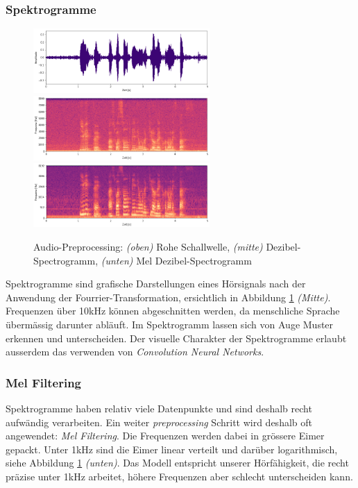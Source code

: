 \subsubsection{Spektrogramme}
\begin{figure}[hbt]
	\centering
		\includegraphics[width=0.6\textwidth]{assets/audio_raw.png}
		\includegraphics[width=0.6\textwidth]{assets/audio_log.png}
		\includegraphics[width=0.6\textwidth]{assets/audio_mel.png}
	\centering
	\caption{Audio-Preprocessing: \textit{(oben)} Rohe Schallwelle, \textit{(mitte)}
		     Dezibel-Spectrogramm, 
		     \textit{(unten)} Mel Dezibel-Spectrogramm}
	\label{img:preprocessing}
\end{figure}
Spektrogramme sind grafische Darstellungen eines Hörsignals nach der Anwendung der Fourrier-Transformation\parencite[]['Spectrograms']{fourrier}, ersichtlich in Abbildung \ref{img:preprocessing} \textit{(Mitte)}. Frequenzen über 10kHz können abgeschnitten werden, da menschliche Sprache übermässig darunter abläuft\parencite{tenkHz}. Im Spektrogramm lassen sich von Auge Muster erkennen und unterscheiden. Der visuelle Charakter der Spektrogramme erlaubt ausserdem das verwenden von \textit{Convolution Neural Networks}.

\subsubsection{Mel Filtering}

Spektrogramme haben relativ viele Datenpunkte und sind deshalb recht aufwändig verarbeiten. Ein weiter \textit{preprocessing} Schritt wird deshalb oft angewendet: \textit{Mel Filtering}\parencite{mel}. Die Frequenzen werden dabei in grössere Eimer gepackt. Unter 1kHz sind die Eimer linear verteilt und darüber logarithmisch, siehe Abbildung \ref{img:preprocessing} \textit{(unten)}. Das Modell entspricht unserer Hörfähigkeit, die recht präzise unter 1kHz arbeitet, höhere Frequenzen aber schlecht unterscheiden kann\parencite{tenkHz}. 

